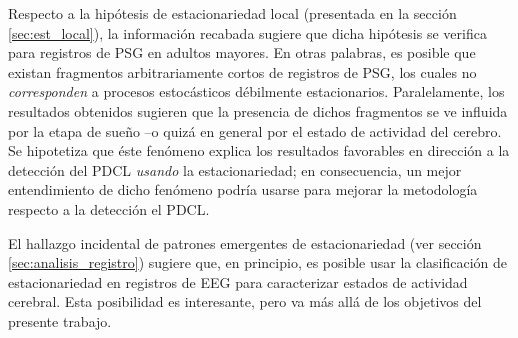 \documentclass[12pt,letterpaper]{book}
\begin{document}
Respecto a la hipótesis de estacionariedad local (presentada en la sección \ref{sec:est_local}), la información recabada sugiere que dicha hipótesis se verifica para registros de PSG en adultos mayores.
%
En otras palabras, es posible que existan fragmentos arbitrariamente cortos de registros de PSG, los cuales no \textit{corresponden} a procesos estocásticos débilmente estacionarios.
%
Paralelamente, los resultados obtenidos sugieren que la presencia de dichos fragmentos se ve influida por la etapa de sueño --o quizá en general por el estado de actividad del cerebro.
%
Se hipotetiza que éste fenómeno explica los resultados {favorables} en dirección a la detección del PDCL \textit{usando} la estacionariedad; en consecuencia, un mejor entendimiento de dicho fenómeno podría usarse para mejorar la metodología respecto a la detección el PDCL.
%



El hallazgo incidental de patrones emergentes de estacionariedad (ver sección \ref{sec:analisis_registro}) sugiere que, en principio, es posible usar la clasificación de estacionariedad en registros de EEG para caracterizar estados de actividad cerebral. 
%
%
Esta posibilidad es interesante, pero va más allá de los objetivos del presente trabajo.
 

\end{document}
